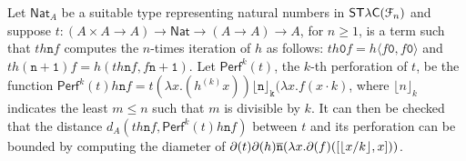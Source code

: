 Let $\mathsf{Nat}_{A}$ be a suitable type representing natural numbers in $\mathsf{ST\lambda C}(\mathcal F_{n})$ and suppose  $t: (A\times A\to A) \to \mathsf{Nat}\to (A\to A)\to A$, for $n\geq 1$, is a term such that $th\mathtt n f$ 
computes the $n$-times iteration of $h$ as follows: $th \mathtt 0f= h\langle f\mathtt 0, f\mathtt 0\rangle$ and $th(\mathtt{n+1})f=h(th\mathtt n f, f\mathtt{n+1})$. 
Let $\mathsf{Perf}^{k}(t)$, the $k$-th perforation of $t$, be the function 
$\mathsf{Perf}^{k}(t)h\mathtt nf= t(\lambda x. (h^{(k)}x)) \mathtt{\lfloor n\rfloor_{k}} (\lambda x. f(x\cdot k)$, where $\lfloor n\rfloor_{k}$ indicates the least $m\leq n$ such that $m$ is divisible by $k$. 
It can then be checked that the distance 
$d_{A}(th\mathtt n f,  \mathsf{Perf}^{k}(t)h\mathtt nf  )$ between $t$ and its perforation can be bounded by 
computing the diameter of $\partial(t)   \partial(h) \overline{\mathtt n} (\lambda x.\partial (f)([\lfloor x/k\rfloor, x]))$.

%
%
%

%
%
%
%
%
%




